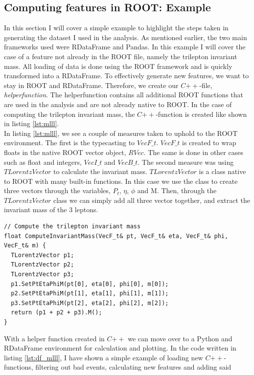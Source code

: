 \subsection{Computing features in ROOT: Example}
In this section I will cover a simple example to highlight the steps taken in generating the dataset 
I used in the analysis. As mentioned earlier, the two main frameworks used were RDataFrame and Pandas. 
In this example I will cover the case of a feature not already in the ROOT file, namely the trilepton
invariant mass. All loading of data is done using the ROOT framework and is quickly transformed into a 
RDataFrame. To effectively generate new features, we want to stay in ROOT and RDataFrame. Therefore,
we create our $C{++}$-file, \emph{helperfunction}. The helperfunction contains all additional 
ROOT functions that are used in the analysis and are not already native to ROOT. In the case 
of computing the trilepton invariant mass, the $C{++}$-function is created like shown in listing 
\ref{lst:mlll}.
\\
In listing \ref{lst:mlll}, we see a couple of measures taken to uphold to the ROOT environment. The first is 
the typecasting to $VecF\_t$. $VecF\_t$ is created to wrap floats in the native ROOT vector object, $RVec$. 
The same is done in other cases such as float and integers, $VecI\_t$ and $VecB\_t$. The second measure
was using $TLorentzVector$ \cite{TLorentzVector} to calculate the invariant mass. $TLorentzVector$ is a class
native to ROOT with many built-in functions. In this case we use the class to create three vectors through the 
variables, $P_t$, $\eta$, $\phi$ and M. Then, through the $TLorentzVector$ class we can simply
add all three vector together, and extract the invariant mass of the 3 leptons. 
\lstset{style=Cpp}
\begin{lstlisting}[caption={$C{++}$-function for $M_{lll}$.},captionpos=b, label={lst:mlll}]
// Compute the trilepton invariant mass 
float ComputeInvariantMass(VecF_t& pt, VecF_t& eta, VecF_t& phi, VecF_t& m) {
  TLorentzVector p1;
  TLorentzVector p2;
  TLorentzVector p3;
  p1.SetPtEtaPhiM(pt[0], eta[0], phi[0], m[0]);
  p2.SetPtEtaPhiM(pt[1], eta[1], phi[1], m[1]);
  p3.SetPtEtaPhiM(pt[2], eta[2], phi[2], m[2]);
  return (p1 + p2 + p3).M();
}
\end{lstlisting}
With a helper function created in $C{++}$ we can move over to a Python and RDataFrame environment
for calculation and plotting. In the code written in listing \ref{lst:df_mlll}, I have shown a simple example 
of loading new $C{++}$-functions, filtering out bad events, calculating new features and adding said 

